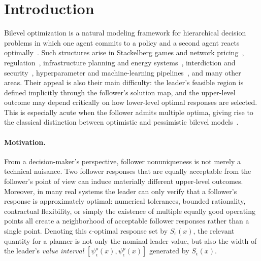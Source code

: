 \documentclass[11pt]{article}
\theoremstyle{definition}
\newcommand{\eps}{\epsilon}
\begin{document}
\section{Introduction}\label{sec:intro}
Bilevel optimization is a natural modeling framework for hierarchical decision problems in which one agent commits to a policy and a second agent reacts optimally~\cite{colson2007overview,liu2025bidirectional,wang2026algebraic,wang2025analysis,
dempe2002foundations,zemkohoo2020bilevel,kleinert2021survey,luo1996mathematical}. 
Such structures arise in Stackelberg games and network pricing~\cite{labbe1998bilevel,brotcorne2001bilevel,dempe2013bilevel,
gilbert2015numerical}, regulation~\cite{bard2013practical,wan2014estimation}, infrastructure planning
and energy systems~\cite{gabriel2012complementarity,wang2025analysis1,liang2025global,wogrin2020applications},
interdiction and security~\cite{smith2020survey,wang2026introduction1,caprara2016bilevel,israeli2002shortest},
hyperparameter and machine-learning pipelines~\cite{franceschi2018bilevel,wang2026damage,liu2021investigating}, and many
other areas. 
Their appeal is also their main difficulty: the leader's feasible region is defined implicitly through the follower's solution map, and the upper-level outcome may depend critically on how lower-level optimal responses are selected. This is especially acute when the follower admits multiple optima,
giving rise to the classical distinction between optimistic and pessimistic bilevel models~\cite{loridan1996weak,dempe2002foundations,yu2026pattern,wiesemann2013pessimistic,wang2025multi,beck2023survey,gao2022rolling,besanccon2019near,wang2026lecture,wang2026first,wang2026introduction}.

\paragraph{Motivation.}
From a decision-maker's perspective, follower nonuniqueness is not merely a technical nuisance. Two follower responses that are equally acceptable from the follower's point of view can induce materially
different upper-level outcomes. 
Moreover, in many real systems the leader can only verify that a follower's response is approximately optimal: numerical tolerances, bounded rationality, contractual flexibility, or simply the existence of
multiple equally good operating points all create a neighborhood of acceptable follower responses rather than a single point. Denoting this $\eps$-optimal response set by $S_\eps(x)$, the relevant
quantity for a planner is not only the nominal leader value, but
also the width of the leader's \emph{value interval}
$[\psi_\eps^o(x),\psi_\eps^p(x)]$ generated by $S_\eps(x)$.
\end{document}
